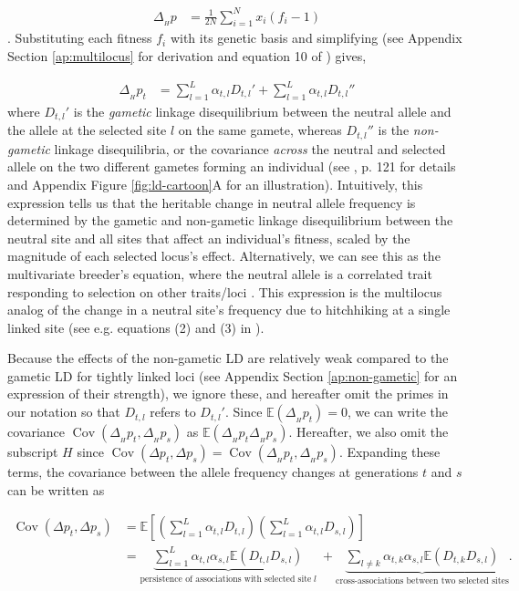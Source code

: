 \documentclass[11pt]{article}
\newcommand{\nnn}{\nonumber}
\newcommand{\E}{\mathbb{E}}
\DeclareMathOperator{\cov}{Cov}
\begin{document}
\begin{align}
  \Delta_{_H} p &= \frac{1}{2N} \sum_{i=1}^N x_i (f_i - 1)
\end{align}
%
\parencite{Santiago1995-hx}. Substituting each fitness $f_i$ with its genetic
basis and simplifying (see Appendix Section \ref{ap:multilocus} for
derivation and equation 10 of \cite{Kirkpatrick2002-aw}) gives,

\begin{align}
  \Delta_{_H} p_t &=  \sum_{l=1}^L \alpha_{t,l} D_{t,l}' + \sum_{l=1}^L \alpha_{t,l} D_{t,l}'' 
\label{eq:neut-change}
\end{align}
%
where $D_{t,l}'$ is the \emph{gametic} linkage disequilibrium between the
neutral allele and the allele at the selected site $l$ on the same gamete,
whereas $D_{t,l}''$ is the \emph{non-gametic} linkage disequilibria, or the
covariance \emph{across} the neutral and selected allele on the two different
gametes forming an individual (see \cite{Weir1996-mv}, p. 121 for details and
Appendix Figure \ref{fig:ld-cartoon}A for an illustration). Intuitively, this
expression tells us that the heritable change in neutral allele frequency is
determined by the gametic and non-gametic linkage disequilibrium between the
neutral site and all sites that affect an individual's fitness, scaled by the
magnitude of each selected locus's effect. Alternatively, we can see this as
the multivariate breeder's equation, where the neutral allele is a correlated
trait responding to selection on other traits/loci \parencite{Lande1979-rq}.
This expression is the multilocus analog of the change in a neutral site's
frequency due to hitchhiking at a single linked site (see e.g. equations (2)
and (3) in \cite{Stephan2006-xz}). 

Because the effects of the non-gametic LD are relatively weak compared to the
gametic LD for tightly linked loci (see Appendix Section \ref{ap:non-gametic}
for an expression of their strength), we ignore these, and hereafter omit the
primes in our notation so that $D_{t,l}$ refers to $D_{t,l}'$.  Since
$\E(\Delta_{_H} p_t) = 0$, we can write the covariance $\cov(\Delta_{_H} p_t,
\Delta_{_H} p_s)$ as $\E(\Delta_{_H} p_t \Delta_{_H} p_s)$.  Hereafter, we also
omit the subscript $H$ since $\cov(\Delta p_t, \Delta p_s) = \cov(\Delta_{_H}
p_t, \Delta_{_H} p_s)$. Expanding these terms, the covariance between the
allele frequency changes at generations $t$ and $s$ can be written as

\begin{align}
  \cov(\Delta p_t, \Delta p_s) &=  \E \left[\left(\sum_{l=1}^L \alpha_{t,l} D_{t,l}\right) \left( \sum_{l=1}^L \alpha_{t,l} D_{s,l} \right) \right]\nnn \\ 
                               &=  \underbrace{\sum_{l=1}^L \alpha_{t,l} \alpha_{s,l} \E(D_{t,l}  D_{s,l})}_{\text{persistence of associations with selected site} \; l}  \; + 
  \underbrace{\sum_{l \ne k} \alpha_{t,k} \alpha_{s,l}\E(D_{t,k}  D_{s,l})}_{\text{cross-associations between two selected sites}}. 
  \label{eq:multilocus-twopart}
\end{align}
\end{document}
